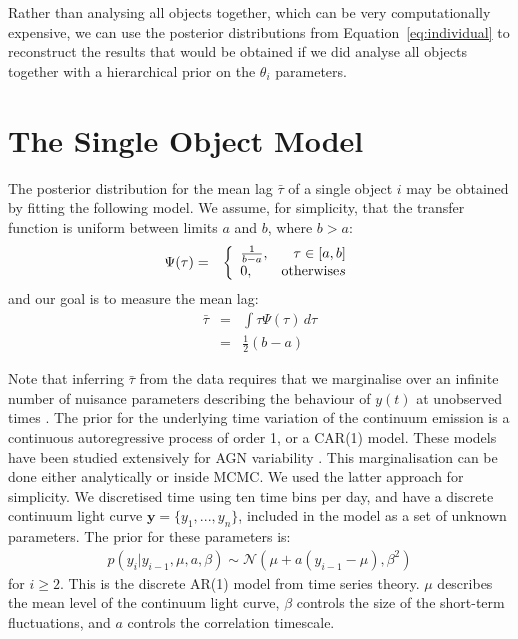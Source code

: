 \documentclass[useAMS,usenatbib]{mn2e}
\begin{document}
Rather than
analysing all objects together, which can be very computationally expensive,
we can use the posterior distributions from Equation~\ref{eq:individual}
to reconstruct the results that would be obtained if we did analyse all
objects together with a hierarchical prior on the $\theta_i$ parameters.

\section{The Single Object Model}\label{sec:single_object}
The posterior distribution for the mean lag $\bar{\tau}$ of a single object
$i$ may be obtained
by fitting the following model. We assume, for simplicity, that
the transfer function is uniform
between limits $a$ and $b$, where $b > a$:
\begin{eqnarray}
\Psi(\tau) &=& \left\{
\begin{array}{lr}
\frac{1}{b-a}, & \tau \in [a,b]\\
0, & \textnormal{otherwise}s
\end{array}\right.
\end{eqnarray}
and our goal is to measure the mean lag:
\begin{eqnarray}
\bar{\tau} &=& \int \tau \Psi(\tau) \, d\tau\\
&=& \frac{1}{2}(b-a)
\end{eqnarray}

Note that inferring $\bar{\tau}$ from the data requires that we
marginalise over an infinite number of nuisance parameters describing the
behaviour of $y(t)$ at unobserved times \citep{pancoast}.
The prior for the underlying time variation of the continuum emission is
a continuous autoregressive process of order 1, or a CAR(1) model. These models
have been studied extensively for AGN variability
\citep[e.g.][]{2009ApJ...698..895K, 2011ApJ...735...80Z, 2013ApJ...765..106Z}.
This marginalisation can be done
either analytically or inside MCMC. We used the latter approach for simplicity.
We discretised
time using ten time bins per day, and have a discrete continuum light curve
$\mathbf{y} = \{y_1, ..., y_n\}$, included in the model as a set of unknown
parameters. The prior for these parameters is:
\begin{eqnarray}
p(y_i | y_{i-1},  \mu, a, \beta) \sim \mathcal{N}
\left(\mu + a\left(y_{i-1} - \mu\right), \beta^2\right)
\end{eqnarray}
for $i \geq 2$. This is the discrete AR(1) model from time series theory.
$\mu$ describes the mean level of the continuum light curve, $\beta$ controls
the size of the short-term fluctuations, and $a$ controls the correlation
timescale.
\end{document}
